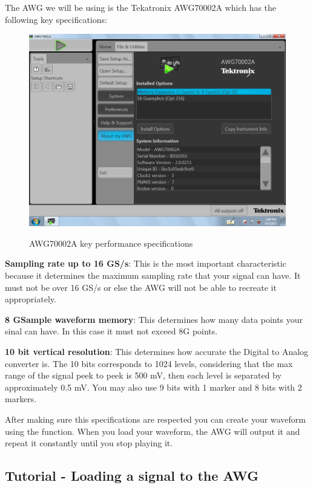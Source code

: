 The AWG we will be using is the Tekatronix AWG70002A which has the following key specifications:
\begin{figure}[h]
	\centering
	\includegraphics[width=\textwidth]{../mtools/sgnToWfm/figures/specs}
	\label{TUT_CompBad}\caption{AWG70002A key performance specifications}
\end{figure}
\bigskip

\textbf{Sampling rate up to 16 GS/s}: This is the most important characteristic  because it determines the maximum sampling rate that your signal can have. It must not be over 16 GS/s or else the AWG will not be able to recreate it appropriately.
\bigskip

\textbf{8 GSample waveform memory}: This determines how many data points your sinal can have. In this case it must not exceed 8G points.
\bigskip

\textbf{10 bit vertical resolution}: This determines how accurate the Digital to Analog converter is. The 10 bits corresponds to 1024 levels, considering that the max range of the signal peek to peek is 500 mV, then each level is separated by approximately 0.5 mV. You may also use 9 bits with 1 marker and 8 bits with 2 markers.
\bigskip

After making sure this specifications are respected you can create your waveform using the function. When you load your waveform, the AWG will output it and repeat it constantly until you stop playing it.


\subsection*{Tutorial - Loading a signal to the AWG}


